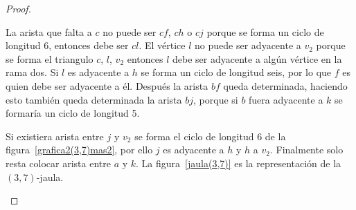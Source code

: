 \documentclass[12pt]{book}
\theoremstyle{definition}
\begin{document}
\begin{proof}
\begin{figure}
  \caption{} \label{grafica1(3,7)mas2}
\end{figure}


La arista que falta a $c$ no puede ser $cf$, $ch$ o $cj$ porque se forma
un ciclo de longitud 6, entonces debe ser  $cl$. El vértice $l$ no
puede ser adyacente a $v_2$ porque se forma el triangulo $c$, $l$,
$v_2$ entonces $l$ debe ser adyacente a algún vértice en la rama
dos. Si $l$ es adyacente a $h$ se forma un ciclo de longitud seis, por lo
que $f$ es quien debe ser adyacente a él. Después la arista $bf$ queda
determinada, haciendo esto también queda determinada la arista $bj$,
porque si $b$ fuera adyacente a  $k$ se formaría un ciclo de longitud
5.

Si existiera arista entre $j$ y $v_2$ se forma el ciclo de longitud 6 de la
figura~\ref{grafica2(3,7)mas2}, por ello $j$ es adyacente a  $h$ y $h$
a $v_2$. Finalmente solo resta colocar arista entre $a$ y $k$. La
figura~\ref{jaula(3,7)} es la representación de la $(3,7)$-jaula.

\begin{figure}
  \centering
\end{figure}
\end{proof}
\end{document}
